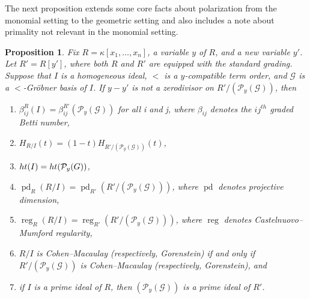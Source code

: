 \documentclass[12pt, reqno]{amsart}
\numberwithin{equation}{section}
\newtheorem{proposition}[theorem]{Proposition}
\newtheorem{Main Conjecture}[theorem]{Main Conjecture}
\theoremstyle{definition}
\theoremstyle{plain}
\newcommand{\hgt}{{\rm{ht }}}
\newcommand{\G}{\mathcal{G}}
\renewcommand{\P}{\mathcal{P}}
\DeclareMathOperator{\pd}{pd}
\DeclareMathOperator{\reg}{reg}
\begin{document}
The next proposition extends some core facts about polarization from the monomial setting to the geometric setting and also includes a note about primality not relevant in the monomial setting.

\begin{proposition}\label{prop:stFacts}
   Fix $R = \kappa[x_1, \ldots, x_n]$, a variable $y$ of $R$, and a new variable $y'$. Let $R' = R[y']$, where both $R$ and $R'$ are equipped with the standard grading. Suppose that $I$ is a homogeneous ideal, $<$ is a $y$-compatible term order, and $\G$ is a $<$-Gr\"obner basis of $I$. If $y-y'$ is not a zerodivisor on $R'/(\P_y(\G))$, then
\begin{enumerate}
    \item $\beta^R_{ij}(I) =\beta^{R'}_{ij} (\P_y(\G))$ for all i and j, where $\beta_{ij}$ denotes the $ij^{th}$ graded Betti number,
\item $H_{R/I}(t) = (1-t)H_{R'/(\P_y(\G))} (t)$,
\item $\hgt(I) = \hgt(\P_y(G))$,
\item $\pd_R(R/I) = \pd_{R'}(R'/(\P_y(\G)))$, where $\pd$ denotes projective dimension,
\item $\reg_R (R/I) = \reg_{R'}(R'/(\P_y(\G)))$, where $\reg$ denotes Castelnuovo--Mumford regularity,
\item $R/I$ is Cohen--Macaulay (respectively, Gorenstein) if and only if $R'/(\P_y(\G))$ is Cohen--Macaulay (respectively, Gorenstein), and 
\item if $I$ is a prime ideal of $R$, then $(\P_y(\G))$ is a prime ideal of $R'$.
\end{enumerate}
\end{proposition}
\end{document}
